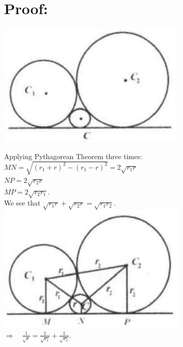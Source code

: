 \documentclass[10pt]{article}
\begin{document}
\section*{Proof:}
\begin{center}
\includegraphics[max width=\textwidth]{2025_04_17_97bc1f7e44d93c271a88g-179(2)}
\end{center}

Applying Pythagorean Theorem three times:\\
\(M N=\sqrt{\left(r_{1}+r\right)^{2}-\left(r_{1}-r\right)^{2}}=2 \sqrt{r_{1} r}\)\\
\(N P=2 \sqrt{r_{2} r}\)\\
\(M P=2 \sqrt{r_{2} r_{1}}\).\\
We see that \(\sqrt{r_{1} r}+\sqrt{r_{2} r}=\sqrt{r_{1} r_{2}}\).\\
\includegraphics[max width=\textwidth, center]{2025_04_17_97bc1f7e44d93c271a88g-179(1)}\\
\(\Rightarrow \quad \frac{1}{\sqrt{r}}=\frac{1}{\sqrt{r_{1}}}+\frac{1}{\sqrt{r_{2}}}\).
\end{document}
